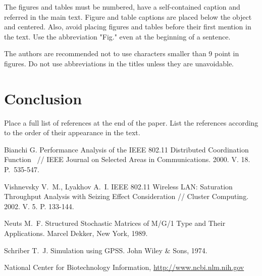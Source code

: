 \documentclass[10pt]{article}
\begin{document}
The figures and tables must be numbered, have a self-contained
caption and referred in the main text. Figure and table
captions are placed below the object and centered. Also, avoid
placing figures and tables before their first mention in the
text. Use the abbreviation "Fig." even at the beginning of a
sentence.

The authors are recommended not to use characters smaller than
9 point in figures. Do not use abbreviations in the titles
unless they are unavoidable.


\section{Conclusion}

Place a full list of references \cite{Bianchi00, VL02, neuts, GPSS, url} at the end of the paper. List
the references according to the order of their appearance in
the text.


\begin{thebibliography}{99}
Bianchi G. Performance Analysis of the IEEE 802.11 Distributed
Coordination Function ~// IEEE Journal on Selected Areas in
Communications. 2000. V. 18. P.~535-547.

 Vishnevsky V.~M., Lyakhov A.~I. IEEE 802.11
    Wireless LAN: Saturation Throughput Analysis with Seizing
    Effect Consideration
// Cluster Computing. 2002. V. 5. P. 133-144.

 Neuts M.~F.  Structured Stochastic
    Matrices of M/G/1 Type and Their Applications. Marcel
    Dekker, New York, 1989.

 Schriber T.~J. Simulation using GPSS. John
    Wiley \& Sons, 1974.
    
 National Center for Biotechnology Information, \url{http://www.ncbi.nlm.nih.gov}

\end{thebibliography}
\end{document}
